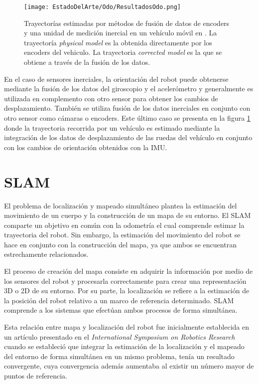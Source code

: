 \begin{figure}[H]
	\centering
	\texttt{[image: EstadoDelArte/Odo/ResultadosOdo.png]}
	\caption[Trayectorías estimadas por métodos de fusión de datos de encoders y una unidad de medición inercial en un vehículo móvil en \cite{odo}]{Trayectorías estimadas por métodos de fusión de datos de encoders y una unidad de medición inercial en un vehículo móvil en \cite{odo}. La trayectoría \textit{physical model} es la obtenida directamente por los encoders del vehiculo. La trayectoria \textit{corrected model} es la que se obtiene a través de la fusión de los datos.}
	\label{fig:OdoEstimacion}
\end{figure}

En el caso de sensores inerciales, la orientación del robot puede obtenerse mediante la fusión de los datos del giroscopio y el acelerómetro y generalmente es utilizada en complemento con otro sensor para obtener los cambios de desplazamiento. También se utiliza fusión de los datos inerciales en conjunto con otro sensor como cámaras o encoders. Este último caso se presenta en la figura \ref{fig:OdoEstimacion} donde la trayectoria recorrida por un vehículo es estimado mediante la integración de los datos de desplazamiento de las ruedas del vehículo en conjunto con los cambios de orientación obtenidos con la IMU.

\section{SLAM}

El problema de localización y mapeado simultáneo plantea la estimación del movimiento de un cuerpo y la construcción de un mapa de su entorno. El SLAM comparte un objetivo en común con la odometría el cual comprende estimar la trayectoria del robot. Sin embargo, la estimación  del movimiento del robot se hace en conjunto con la construcción del mapa, ya que ambos se encuentran estrechamente relacionados.

El proceso de creación del mapa consiste en adquirir la información por medio de los sensores del robot y procesarla correctamente para crear una representación 3D o 2D de su entorno. Por su parte, la localización se refiere a la estimación de la posición del robot relativo a un marco de referencia determinado. SLAM comprende a los sistemas que efectúan ambos procesos de forma simultánea.

Esta relación entre mapa  y localización del robot  fue inicialmente establecida en un artículo presentado en el \textit{International Symposium on Robotics Research} \cite{HarrisAndStephens} cuando se estableció que integrar la estimación de la localización y el mapeado del entorno de forma simultánea en un mismo problema, tenía un resultado convergente, cuya convergencia además aumentaba al existir un número mayor de puntos de referencia. 


